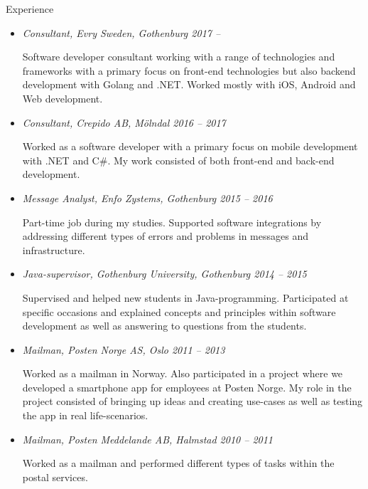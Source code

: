 {\itshape\Large\begin{center}
Experience
\end{center}}

\vspace{12px}

\begin{itemize}
  \item {\itshape Consultant, Evry Sweden, Gothenburg 2017 –}
  
  Software developer consultant working with a range of technologies and 
  frameworks with a primary focus on front-end technologies but also backend development with Golang and .NET.
  Worked mostly with iOS, Android and Web development.

  \item {\itshape Consultant, Crepido AB, Mölndal 2016 – 2017}

  Worked as a software developer with a primary focus on mobile development with 
  .NET and C\#. My work consisted of both front-end and back-end development.

  \item {\itshape Message Analyst, Enfo Zystems, Gothenburg 2015 – 2016}

  Part-time job during my studies. Supported software integrations by addressing 
  different types of errors and problems in messages and infrastructure.

  \item {\itshape Java-supervisor, Gothenburg University, Gothenburg 2014 – 2015}

  Supervised and helped new students in Java-programming. Participated at specific 
  occasions and explained concepts and principles within software development as 
  well as answering to questions from the students.

  \item {\itshape Mailman, Posten Norge AS, Oslo 2011 – 2013}
  
  Worked as a mailman in Norway. Also participated in a project where we developed 
  a smartphone app for employees at Posten Norge. My role in the project consisted 
  of bringing up ideas and creating use-cases as well as testing the app in real life-scenarios.

  \item {\itshape Mailman, Posten Meddelande AB, Halmstad 2010 – 2011}
  
  Worked as a mailman and performed different types of tasks within the postal services.

\end{itemize}

